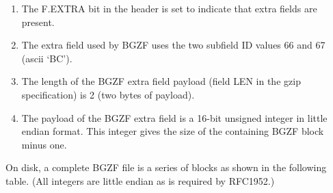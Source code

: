 \documentclass[10pt]{article}
\begin{document}
\begin{enumerate}
\item The {\sf F.EXTRA} bit in the header is set to indicate that extra
  fields are present.
\item The extra field used by BGZF uses the two subfield ID values 66 and 67 (ascii `BC').
\item The length of the BGZF extra field payload (field {\sf LEN} in the
  gzip specification) is 2 (two bytes of payload).
\item The payload of the BGZF extra field is a 16-bit unsigned integer
  in little endian format. This integer gives the size of the containing
  BGZF block minus one.
\end{enumerate}

On disk, a complete BGZF file is a series of blocks as shown in the following
table.  (All integers are little endian as is required by RFC1952.)
\end{document}
